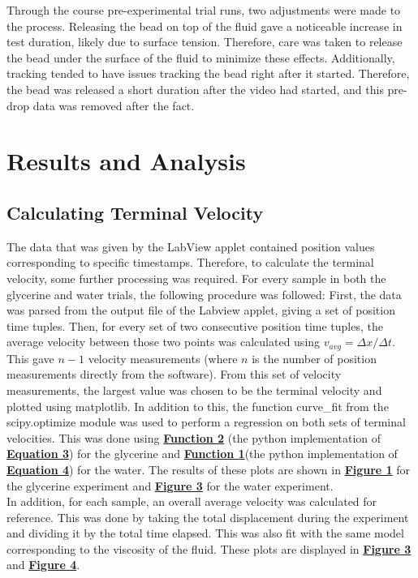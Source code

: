 \documentclass[
	letterpaper
	12pt
]{template}
\newcommand{\bref}[2]{\textbf{\hyperref[#1]{#2}}}
\begin{document}
Through the course pre-experimental trial runs, two adjustments were made to the process. Releasing the bead on top of the fluid gave a noticeable increase in test duration, likely due to surface tension. Therefore, care was taken to release the bead under the surface of the fluid to minimize these effects. Additionally, tracking tended to have issues tracking the bead right after it started. Therefore, the bead was released a short duration after the video had started, and this pre-drop data was removed after the fact.
\section{Results and Analysis}
\subsection{Calculating Terminal Velocity}
The data that was given by the LabView applet contained position values corresponding to specific timestamps. Therefore, to calculate the terminal velocity, some further processing was required. For every sample in both the glycerine and water trials, the following procedure was followed: First, the data was parsed from the output file of the Labview applet, giving a set of position time tuples. Then, for every set of two consecutive position time tuples, the average velocity between those two points was calculated using $v_{avg} = \Delta x/ \Delta t$. This gave $n-1$ velocity measurements (where $n$ is the number of position measurements directly from the software). From this set of velocity measurements, the largest value was chosen to be the terminal velocity and plotted using matplotlib. In addition to this, the function curve\_fit from the scipy.optimize module was used to perform a regression on both sets of terminal velocities. This was done using \bref{squaredFit}{Function 2} (the python implementation of  \bref{lowReynold}{Equation 3}) for the glycerine and \bref{sqrtFit}{Function 1}(the python implementation of  \bref{highReynold}{Equation 4}) for the water. The results of these plots are shown in \bref{terminalGlyc}{Figure 1} for the glycerine experiment and \bref{terminalWater}{Figure 3} for the water experiment.\\

In addition, for each sample, an overall average velocity was calculated for reference. This was done by taking the total displacement during the experiment and dividing it by the total time elapsed. This was also fit with the same model corresponding to the viscosity of the fluid. These plots are displayed in \bref{avgGlyc}{Figure 3} and \bref{averageWater}{Figure 4}.\\
\end{document}
